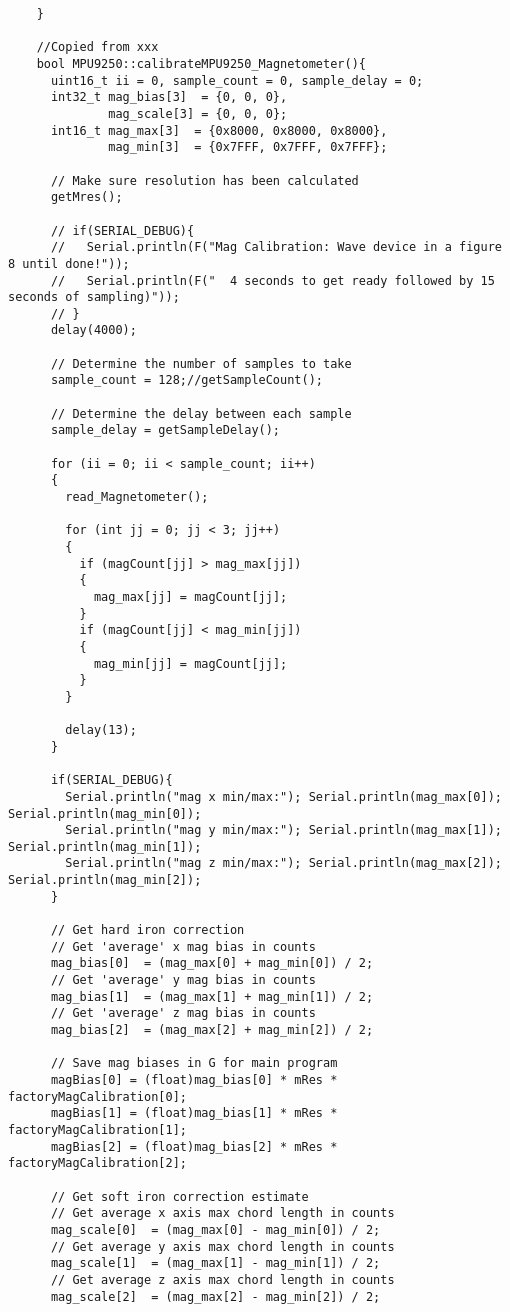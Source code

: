 \begin{lstlisting}
	}

	//Copied from xxx
	bool MPU9250::calibrateMPU9250_Magnetometer(){
	  uint16_t ii = 0, sample_count = 0, sample_delay = 0;
	  int32_t mag_bias[3]  = {0, 0, 0},
	          mag_scale[3] = {0, 0, 0};
	  int16_t mag_max[3]  = {0x8000, 0x8000, 0x8000},
	          mag_min[3]  = {0x7FFF, 0x7FFF, 0x7FFF};

	  // Make sure resolution has been calculated
	  getMres();

	  // if(SERIAL_DEBUG){
	  //   Serial.println(F("Mag Calibration: Wave device in a figure 8 until done!"));
	  //   Serial.println(F("  4 seconds to get ready followed by 15 seconds of sampling)"));
	  // }
	  delay(4000);

	  // Determine the number of samples to take
	  sample_count = 128;//getSampleCount();

	  // Determine the delay between each sample
	  sample_delay = getSampleDelay();

	  for (ii = 0; ii < sample_count; ii++)
	  {
	    read_Magnetometer();

	    for (int jj = 0; jj < 3; jj++)
	    {
	      if (magCount[jj] > mag_max[jj])
	      {
	        mag_max[jj] = magCount[jj];
	      }
	      if (magCount[jj] < mag_min[jj])
	      {
	        mag_min[jj] = magCount[jj];
	      }
	    }

	    delay(13);
	  }

	  if(SERIAL_DEBUG){
	    Serial.println("mag x min/max:"); Serial.println(mag_max[0]); Serial.println(mag_min[0]);
	    Serial.println("mag y min/max:"); Serial.println(mag_max[1]); Serial.println(mag_min[1]);
	    Serial.println("mag z min/max:"); Serial.println(mag_max[2]); Serial.println(mag_min[2]);
	  }

	  // Get hard iron correction
	  // Get 'average' x mag bias in counts
	  mag_bias[0]  = (mag_max[0] + mag_min[0]) / 2;
	  // Get 'average' y mag bias in counts
	  mag_bias[1]  = (mag_max[1] + mag_min[1]) / 2;
	  // Get 'average' z mag bias in counts
	  mag_bias[2]  = (mag_max[2] + mag_min[2]) / 2;

	  // Save mag biases in G for main program
	  magBias[0] = (float)mag_bias[0] * mRes * factoryMagCalibration[0];
	  magBias[1] = (float)mag_bias[1] * mRes * factoryMagCalibration[1];
	  magBias[2] = (float)mag_bias[2] * mRes * factoryMagCalibration[2];

	  // Get soft iron correction estimate
	  // Get average x axis max chord length in counts
	  mag_scale[0]  = (mag_max[0] - mag_min[0]) / 2;
	  // Get average y axis max chord length in counts
	  mag_scale[1]  = (mag_max[1] - mag_min[1]) / 2;
	  // Get average z axis max chord length in counts
	  mag_scale[2]  = (mag_max[2] - mag_min[2]) / 2;


\end{lstlisting}
